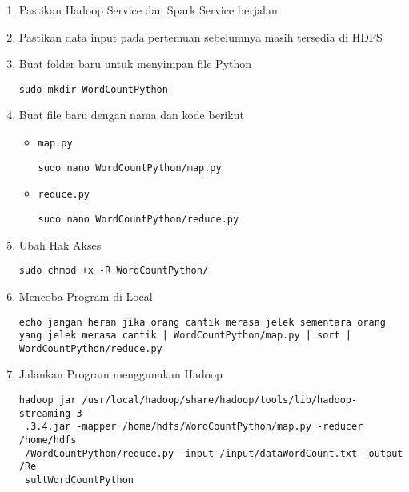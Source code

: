 \documentclass[a4paper]{tufte-handout}
\begin{document}
\begin{enumerate}
\item Pastikan Hadoop Service dan Spark Service berjalan
\item Pastikan data input pada pertemuan sebelumnya masih tersedia di HDFS
\item Buat folder baru untuk menyimpan file Python
\begin{lstlisting}[language=Terminal]
 sudo mkdir WordCountPython
\end{lstlisting}

\item Buat file baru dengan nama dan kode berikut
\begin{itemize}
\item {\tt map.py}
\begin{lstlisting}[language=Terminal]
 sudo nano WordCountPython/map.py
\end{lstlisting}
 


\item {\tt reduce.py}
\begin{lstlisting}[language=Terminal]
 sudo nano WordCountPython/reduce.py
\end{lstlisting} 

\end{itemize}

\item Ubah Hak Akses
\begin{lstlisting}[language=Terminal]
 sudo chmod +x -R WordCountPython/
\end{lstlisting}

\item Mencoba Program di Local
\begin{lstlisting}[language=Terminal]
 echo jangan heran jika orang cantik merasa jelek sementara orang yang jelek merasa cantik | WordCountPython/map.py | sort | WordCountPython/reduce.py
\end{lstlisting}

\item Jalankan Program menggunakan Hadoop
\begin{lstlisting}[language=Terminal]
 hadoop jar /usr/local/hadoop/share/hadoop/tools/lib/hadoop-streaming-3
 .3.4.jar -mapper /home/hdfs/WordCountPython/map.py -reducer /home/hdfs
 /WordCountPython/reduce.py -input /input/dataWordCount.txt -output /Re
 sultWordCountPython
\end{lstlisting}


\end{enumerate}
\end{document}
